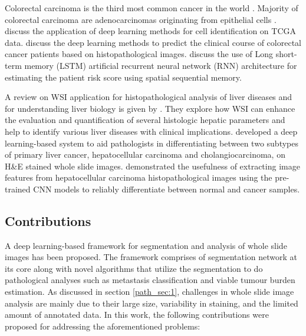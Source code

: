 \documentclass[times,twocolumn,final,authoryear]{tmp}
\begin{document}
Colorectal carcinoma is the third most common cancer in the world \citep{fleming2012colorectal}. Majority of colorectal carcinoma are adenocarcinomas originating from epithelial cells \citep{hamilton2000carcinoma}. \citep{shapcott2019deep} discuss the application of deep learning methods for cell identification on TCGA data. \citep{kather2019predicting} discuss the deep learning methods to predict the clinical course of colorectal cancer patients based on histopathological images. \citep{bychkov2018deep} discuss the use of Long short-term memory (LSTM) \citep{greff2016lstm} artificial recurrent neural network (RNN) architecture for estimating the patient risk score using spatial sequential memory.

A review on WSI application for histopathological analysis of liver diseases and for understanding liver biology is given by \citep{melo2019whole}. They explore how WSI can enhance the evaluation and quantification of several histologic hepatic parameters and help to identify various liver diseases with clinical implications. \citep{kiani2020impact} developed a deep learning-based system to aid pathologists in differentiating between two subtypes of primary liver cancer, hepatocellular carcinoma and cholangiocarcinoma, on H\&E stained whole slide images. \citep{Lu2020prognostic} demonstrated the usefulness of extracting image features from hepatocellular carcinoma histopathological images using the pre-trained CNN models to reliably differentiate between normal and cancer samples. 


\subsection{Contributions}
\label{path_sec:path_contribs}

A deep learning-based framework for segmentation and analysis of whole slide images has been proposed. The framework comprises of segmentation network at its core along with novel algorithms that utilize the segmentation to do pathological analyses such as metastasis classification and viable tumour burden estimation. As discussed in section \ref{path_sec:1}, challenges in whole slide image analysis are mainly due to their large size, variability in staining, and the limited amount of annotated data. In this work, the following contributions were proposed for addressing the aforementioned problems:
\end{document}
